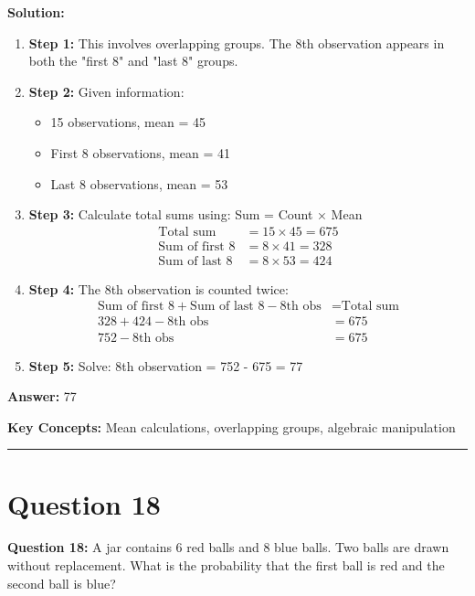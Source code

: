 \documentclass[12pt]{article}
\begin{document}
\textbf{Solution:}
\begin{enumerate}
\item \textbf{Step 1:} This involves overlapping groups. The 8th observation appears in both the "first 8" and "last 8" groups.

\item \textbf{Step 2:} Given information:
\begin{itemize}
\item 15 observations, mean = 45
\item First 8 observations, mean = 41
\item Last 8 observations, mean = 53
\end{itemize}

\item \textbf{Step 3:} Calculate total sums using: Sum = Count × Mean
\begin{align}
\text{Total sum} &= 15 \times 45 = 675 \\
\text{Sum of first 8} &= 8 \times 41 = 328 \\
\text{Sum of last 8} &= 8 \times 53 = 424
\end{align}

\item \textbf{Step 4:} The 8th observation is counted twice:
\begin{align}
\text{Sum of first 8} + \text{Sum of last 8} - \text{8th obs} &= \text{Total sum} \\
328 + 424 - \text{8th obs} &= 675 \\
752 - \text{8th obs} &= 675
\end{align}

\item \textbf{Step 5:} Solve: 8th observation = 752 - 675 = 77
\end{enumerate}

\textbf{Answer:} 77

\textbf{Key Concepts:} Mean calculations, overlapping groups, algebraic manipulation

\hrule
\vspace{1em}

\newpage

\section{Question 18}

\textbf{Question 18:} A jar contains 6 red balls and 8 blue balls. Two balls are drawn without replacement. What is the probability that the first ball is red and the second ball is blue?
\end{document}
